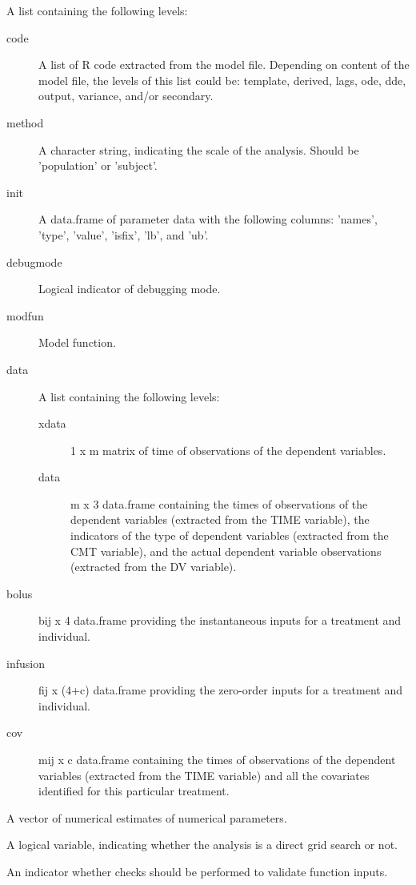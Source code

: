 \begin{Arguments}
\begin{ldescription}
\item[\code{subproblem}] A list containing the following levels:\begin{description}

\item[code] A list of R code extracted from the model file. Depending on 
content of the model file, the levels of this list could be: template,
derived, lags, ode, dde, output, variance, and/or secondary.
\item[method] A character string, indicating the scale of the analysis. Should
be 'population' or 'subject'.
\item[init] A data.frame of parameter data with the following columns:
'names', 'type', 'value', 'isfix', 'lb', and 'ub'.
\item[debugmode] Logical indicator of debugging mode.
\item[modfun] Model function.
\item[data] A list containing the following levels:\begin{description}

\item[xdata] 1 x m matrix of time of observations of the dependent
variables.
\item[data] m x 3 data.frame containing the times of observations of the
dependent variables (extracted from the TIME variable), the indicators 
of the type of dependent variables (extracted from the CMT variable), 
and the actual dependent variable observations (extracted from the DV 
variable).

\end{description}


\item[bolus] bij x 4 data.frame providing the instantaneous inputs for a
treatment and individual.
\item[infusion] fij x (4+c) data.frame providing the zero-order inputs for a
treatment and individual.
\item[cov] mij x c data.frame containing the times of observations of the 
dependent variables (extracted from the TIME variable) and all the
covariates identified for this particular treatment.

\end{description}


\item[\code{x}] A vector of numerical estimates of numerical parameters.
\item[\code{grid}] A logical variable, indicating whether the analysis is a direct
grid search or not.
\item[\code{check}] An indicator whether checks should be performed to validate 
function inputs.
\end{ldescription}
\end{Arguments}
